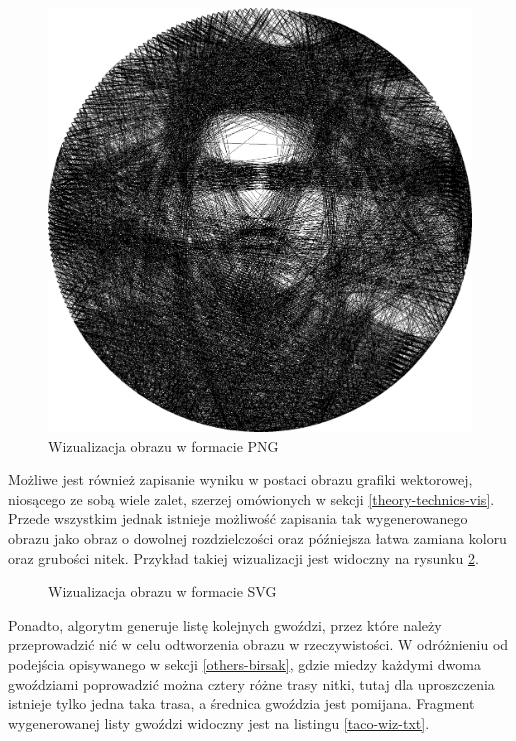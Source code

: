 \documentclass[a4paper, 12pt, polish, twoside]{extreport}
\begin{document}
    \begin{figure}[H]
        \centering
        \includegraphics[width=\textwidth,keepaspectratio]{img/4-mine/taco-vis/taco_e_i3000_c20_inv0_bg1_obj100_ed255.png}
        \caption{Wizualizacja obrazu w formacie PNG}
        \label{taco-wiz-png}
    \end{figure}
    \newpage
    
    Możliwe jest również zapisanie wyniku w postaci obrazu grafiki wektorowej, niosącego ze sobą wiele zalet, szerzej omówionych w sekcji \ref{theory-technics-vis}. Przede wszystkim jednak istnieje możliwość zapisania tak wygenerowanego obrazu jako obraz o dowolnej rozdzielczości oraz późniejsza łatwa zamiana koloru oraz grubości nitek. Przykład takiej wizualizacji jest widoczny na rysunku \ref{taco-wiz-svg}.
    
    \begin{figure}[H]
        \centering
        
        \caption{Wizualizacja obrazu w formacie SVG}
        \label{taco-wiz-svg}
    \end{figure}
    \newpage
    
    Ponadto, algorytm generuje listę kolejnych gwoździ, przez które należy przeprowadzić nić w celu odtworzenia obrazu w rzeczywistości. W odróżnieniu od podejścia opisywanego w sekcji \ref{others-birsak}, gdzie miedzy każdymi dwoma gwoździami poprowadzić można cztery różne trasy nitki, tutaj dla uproszczenia istnieje tylko jedna taka trasa, a średnica gwoździa jest pomijana. Fragment wygenerowanej listy gwoździ widoczny jest na listingu \ref{taco-wiz-txt}.
   
\end{document}
